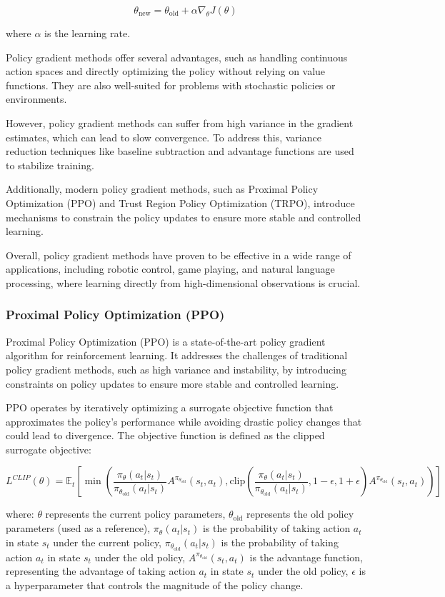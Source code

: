 \[\theta_{\text{new}} = \theta_{\text{old}} + \alpha \nabla_{\theta} J(\theta)\]

where \(\alpha\) is the learning rate.

Policy gradient methods offer several advantages, such as handling continuous action spaces and directly optimizing the policy without relying on value functions. They are also well-suited for problems with stochastic policies or environments.

However, policy gradient methods can suffer from high variance in the gradient estimates, which can lead to slow convergence. To address this, variance reduction techniques like baseline subtraction and advantage functions are used to stabilize training.

Additionally, modern policy gradient methods, such as Proximal Policy Optimization (PPO) and Trust Region Policy Optimization (TRPO), introduce mechanisms to constrain the policy updates to ensure more stable and controlled learning.

Overall, policy gradient methods have proven to be effective in a wide range of applications, including robotic control, game playing, and natural language processing, where learning directly from high-dimensional observations is crucial.

\subsubsection{Proximal Policy Optimization (PPO)}
Proximal Policy Optimization (PPO) is a state-of-the-art policy gradient algorithm for reinforcement learning. It addresses the challenges of traditional policy gradient methods, such as high variance and instability, by introducing constraints on policy updates to ensure more stable and controlled learning.

PPO operates by iteratively optimizing a surrogate objective function that approximates the policy's performance while avoiding drastic policy changes that could lead to divergence. The objective function is defined as the clipped surrogate objective:

\[L^{CLIP}(\theta) = \mathbb{E}_{t} \left[ \min \left( \frac{\pi_{\theta}(a_t|s_t)}{\pi_{\theta_{\text{old}}}(a_t|s_t)} A^{\pi_{\theta_{\text{old}}}}(s_t, a_t), \text{clip}\left( \frac{\pi_{\theta}(a_t|s_t)}{\pi_{\theta_{\text{old}}}(a_t|s_t)}, 1-\epsilon, 1+\epsilon \right) A^{\pi_{\theta_{\text{old}}}}(s_t, a_t) \right) \right]\]

where:
\(\theta\) represents the current policy parameters,
\(\theta_{\text{old}}\) represents the old policy parameters (used as a reference),
\(\pi_{\theta}(a_t|s_t)\) is the probability of taking action \(a_t\) in state \(s_t\) under the current policy,
\(\pi_{\theta_{\text{old}}}(a_t|s_t)\) is the probability of taking action \(a_t\) in state \(s_t\) under the old policy,
\(A^{\pi_{\theta_{\text{old}}}}(s_t, a_t)\) is the advantage function, representing the advantage of taking action \(a_t\) in state \(s_t\) under the old policy,
\(\epsilon\) is a hyperparameter that controls the magnitude of the policy change.

